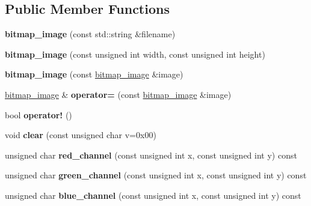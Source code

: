\subsection*{Public Member Functions}
\begin{DoxyCompactItemize}
\item 
\mbox{\label{classbitmap__image_a168c463ffaea6fb532a410464bd2f318}} 
{\bfseries bitmap\+\_\+image} (const std\+::string \&filename)
\item 
\mbox{\label{classbitmap__image_a0665d93e7a4d164d6b996c47a451daee}} 
{\bfseries bitmap\+\_\+image} (const unsigned int width, const unsigned int height)
\item 
\mbox{\label{classbitmap__image_a1553282d988ad7d772334dedd29da40b}} 
{\bfseries bitmap\+\_\+image} (const \mbox{\hyperlink{classbitmap__image}{bitmap\+\_\+image}} \&image)
\item 
\mbox{\label{classbitmap__image_a6311703e1ee80f6204979cf0a1004ccf}} 
\mbox{\hyperlink{classbitmap__image}{bitmap\+\_\+image}} \& {\bfseries operator=} (const \mbox{\hyperlink{classbitmap__image}{bitmap\+\_\+image}} \&image)
\item 
\mbox{\label{classbitmap__image_a5d6bcc7fa64fa5dfbd2f39d29a2bbd82}} 
bool {\bfseries operator!} ()
\item 
\mbox{\label{classbitmap__image_a55caa75a5088e56d5e788148635d1838}} 
void {\bfseries clear} (const unsigned char v=0x00)
\item 
\mbox{\label{classbitmap__image_a4364c0d5eeab276e180544797b2d401c}} 
unsigned char {\bfseries red\+\_\+channel} (const unsigned int x, const unsigned int y) const
\item 
\mbox{\label{classbitmap__image_abbe8e1f55d1fa31a5b65169e127b92a2}} 
unsigned char {\bfseries green\+\_\+channel} (const unsigned int x, const unsigned int y) const
\item 
\mbox{\label{classbitmap__image_ab96f66847c718c70f5da10657ff376f8}} 
unsigned char {\bfseries blue\+\_\+channel} (const unsigned int x, const unsigned int y) const

\end{DoxyCompactItemize}
